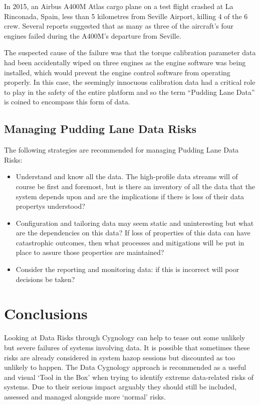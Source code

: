 In 2015, an Airbus A400M Atlas cargo plane on a test flight crashed at La Rinconada, Spain,
less than 5 kilometres from Seville Airport, killing 4 of the 6 crew.
Several reports suggested that as many as three of the aircraft's four engines failed during
the A400M's departure from Seville.

The suspected cause of the failure was that the torque calibration parameter data had been
accidentally wiped on three engines as the engine software was being installed,
which would prevent the engine control software from operating properly.
In this case, the seemingly innocuous calibration data had a critical role to play in the
safety of the entire platform and so the term “Pudding Lane Data” is coined to encompass
this form of data.

\subsection{Managing Pudding Lane Data Risks}
The following strategies are recommended for managing Pudding Lane Data Risks:
\begin{itemize}
\item Understand and know all the data.
The high-profile data streams will of course be first and foremost, but is there an inventory of
all the data that the system depends upon and are the implications if there is loss of their \glspl{data property} understood? 
\item Configuration and tailoring data may seem static and uninteresting but what are the
dependencies on this data?
If loss of properties of this data can have catastrophic outcomes,
then what processes and mitigations will be put in place to assure those properties are maintained?
\item Consider the reporting and monitoring data: if this is incorrect will poor decisions be taken?
\end{itemize}

\section{Conclusions}
Looking at Data Risks through Cygnology can help to tease out some unlikely but severe failures of systems involving data. It is possible that sometimes these risks are already considered in system \gls{hazop} sessions but discounted as too unlikely to happen. The Data Cygnology approach is recommended as a useful and visual ‘Tool in the Box’ when trying to identify extreme data-related risks of systems.
Due to their serious impact arguably they should still be included, assessed and managed alongside more ‘normal’ risks.


